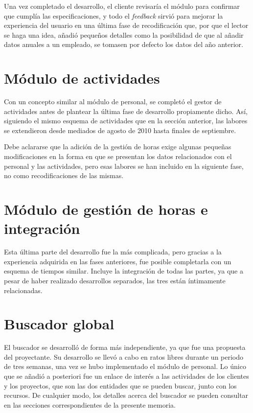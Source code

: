 Una vez completado el desarrollo, el cliente revisaría el módulo para confirmar
que cumplía las especificaciones, y todo el \textit{feedback} sirvió para
mejorar la experiencia del usuario en una última fase de recodificación que,
por que el lector se haga una idea, añadió pequeños detalles como la posibilidad
de que al añadir datos anuales a un empleado, se tomasen por defecto los datos
del año anterior.

\section{Módulo de actividades}

Con un concepto similar al módulo de personal, se completó el
gestor de actividades antes de plantear la última fase de desarrollo
propiamente dicho. Así, siguiendo el mismo esquema de actividades que en la
sección anterior, las labores se extendieron desde mediados de agosto de
2010 hasta finales de septiembre.

Debe aclararse que la adición de la gestión de horas exige algunas pequeñas
modificaciones en la forma en que se presentan los datos relacionados con el
personal y las actividades, pero esas labores se han incluido en la siguiente
fase, no como recodificaciones de las mismas.

\section{Módulo de gestión de horas e integración}

Esta última parte del desarrollo fue la más complicada, pero gracias a la
experiencia adquirida en las fases anteriores, fue posible completarla con un
esquema de tiempos similar. Incluye la integración de todas las partes, ya que
a pesar de haber realizado desarrollos separados, las tres están íntimamente
relacionadas.

\section{Buscador global}

El buscador se desarrolló de forma más independiente, ya que fue una propuesta
del proyectante. Su desarrollo se llevó a cabo en ratos libres durante un
periodo de tres semanas, una vez se hubo implementado el módulo de personal.
Lo único que se añadió a posteriori fue un enlace de interés a las actividades
de los clientes y los proyectos, que son las dos entidades que se pueden
buscar, junto con los recursos. De cualquier modo, los detalles acerca del
buscador se pueden consultar en las secciones correspondientes de la presente
memoria.

